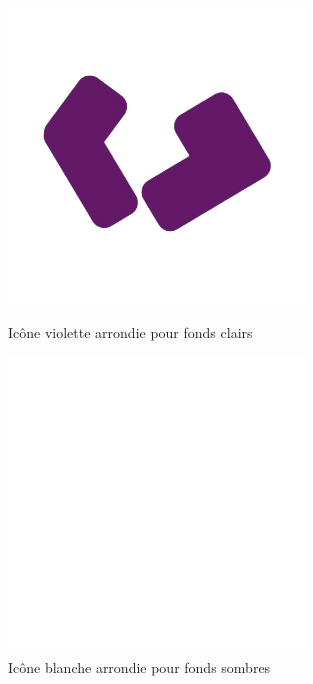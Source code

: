 \documentclass[12pt]{report}
\begin{document}
	
	\begin{figure}[H]
		\centering
		\begin{minipage}[t]{0.32\textwidth}
			\centering
			\includegraphics[width=0.7\textwidth]{img/rounded_logo_purple.png}
			\caption{Icône violette arrondie pour fonds clairs}
		\end{minipage}
		\hfill
		\begin{minipage}[t]{0.32\textwidth}
			\centering
			\includegraphics[width=0.7\textwidth]{img/rounded_logo_white.png}
			\caption{Icône blanche arrondie pour fonds sombres}
		\end{minipage}\hfill
		\begin{minipage}[t]{0.32\textwidth}
			\centering

\end{minipage}
\end{figure}
\end{document}
